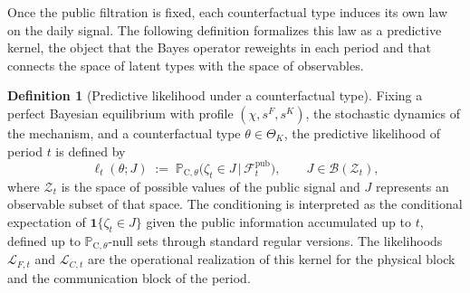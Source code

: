 \documentclass[ecta,nameyear,draft]{econsocart}
\theoremstyle{plain}
\theoremstyle{definition}
\newtheorem{definition}[theorem]{Definition}
\newcommand{\ProbC}[1]{\mathbb{P}_{\mathrm{C},#1}}
\newcommand{\ThetaK}{\Theta_K}
\newcommand{\1}{\mathbf{1}}
\begin{document}
Once the public filtration is fixed, each counterfactual type induces its own law on the daily signal. The following definition formalizes this law as a predictive kernel, the object that the Bayes operator reweights in each period and that connects the space of latent types with the space of observables.

\begin{definition}[Predictive likelihood under a counterfactual type]\label{def:predictive-likelihood}
Fixing a perfect Bayesian equilibrium with profile $(\chi,s^F,s^K)$, the stochastic dynamics of the mechanism, and a counterfactual type $\theta\in\ThetaK$, the predictive likelihood of period $t$ is defined by
\begin{equation}
\label{eq:likelihood-zeta}
\ell_t(\theta;J)\;:=\;\ProbC{\theta}\bigl(\zeta_t \in J \,\big|\, \mathcal{F}_t^{\mathrm{pub}}\bigr),
\qquad J\in\mathcal{B}(\mathcal{Z}_t),
\end{equation}
where $\mathcal{Z}_t$ is the space of possible values of the public signal and $J$ represents an observable subset of that space. The conditioning is interpreted as the conditional expectation of $\mathbf{1}\{\zeta_t\in J\}$ given the public information accumulated up to $t$, defined up to $\ProbC{\theta}$-null sets through standard regular versions. The likelihoods $\mathcal{L}_{F,t}$ and $\mathcal{L}_{C,t}$ are the operational realization of this kernel for the physical block and the communication block of the period.
\end{definition}
\end{document}
